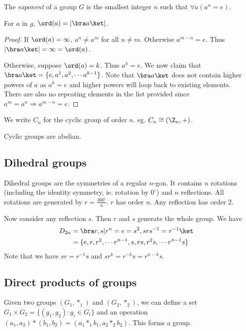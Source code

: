 \documentclass[a4paper]{article}
\begin{document}
\begin{defi}
  The \emph{exponent} of a group $G$ is the smallest integer $n$ such that $\forall a(a^n = e)$.
\end{defi}
\begin{lemma}
  For $a$ in $g$, $\ord (a) = |\bra a\ket|$.
\end{lemma}
\begin{proof}
  If $\ord (a) = \infty$, $a^n \not= a^m$ for all $n\not= m$. Otherwise $a^{m-n} = e$. Thus $|\bra a\ket| = \infty = \ord (a)$.

  Otherwise, suppose $\ord (a) = k$. Thus $a^k = e$. We now claim that $\bra a\ket = \{e, a^1, a^2, \cdots a^{k-1}\}$. Note that $\bra a\ket$ does not contain higher powers of $a$ as $a^k = e$ and higher powers will loop back to existing elements. There are also no repeating elements in the list provided since $a^m = a^n \Rightarrow a^{m-n} = e$.
\end{proof}

\begin{notation}
  We write $C_n$ for the cyclic group of order $n$. eg. $C_n \cong (\Z_n, +)$.
\end{notation}

\begin{prop}
  Cyclic groups are abelian.
\end{prop}

\subsection{Dihedral groups}
\begin{defi}
  Dihedral groups are the symmetries of a regular $n$-gon. It contains $n$ rotations (including the identity symmetry, ie. rotation by $0^\circ$) and $n$ reflections. All rotations are generated by $r = \frac{360^\circ}{n}$. $r$ has order $n$. Any reflection has order 2.

  Now consider any reflection $s$. Then $r$ and $s$ generate the whole group. We have
  \begin{align*}
    D_{2n} &= \bra r, s|r^n=e=s^2, srs^{-1} = r^{-1}\ket\\
    &= \{e, r, r^2, \cdots r^{n-1}, s, rs, r^2s, \cdots r^{n-1}s\}
  \end{align*}
  Note that we have $sr=r^{-1}s$ and $sr^k = r^{-k}s = r^{n-k}s$.
\end{defi}

\subsection{Direct products of groups}
\begin{defi}
  Given two groups $(G_1, *_1)$ and $(G_2, *_2)$, we can define a set $G_1\times G_2 = \{(g_1, g_2): g_i\in G_i\}$ and an operation $(a_1, a_2)*(b_1, b_2) = (a_1*_1b_1, a_2*_2b_2)$. This forms a group.
\end{defi}
\end{document}
